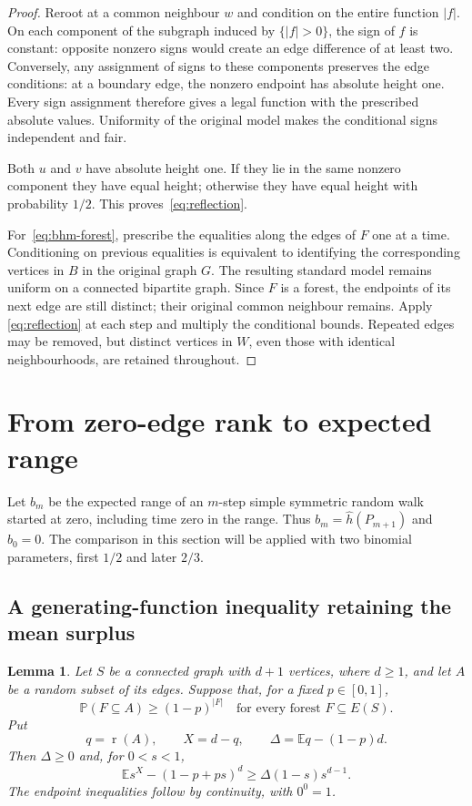\documentclass[11pt,reqno]{amsart}
\newtheorem{lemma}[theorem]{Lemma}
\theoremstyle{remark}
\numberwithin{equation}{section}
\newcommand{\E}{\mathbb E}
\newcommand{\PP}{\mathbb P}
\DeclareMathOperator{\rk}{r}
\begin{document}
\begin{proof}
Reroot at a common neighbour $w$ and condition on the entire function
$|f|$. On each component of the subgraph induced by $\{|f|>0\}$, the
sign of $f$ is constant: opposite nonzero signs would create an edge
difference of at least two. Conversely, any assignment of signs to
these components preserves the edge conditions: at a boundary edge,
the nonzero endpoint has absolute height one. Every sign assignment
therefore gives a legal function with the prescribed absolute values.
Uniformity of the original model makes the conditional signs
independent and fair.

Both $u$ and $v$ have absolute height one. If they lie in the same nonzero
component they have equal height; otherwise they have equal height with
probability $1/2$. This proves~\eqref{eq:reflection}.

For~\eqref{eq:bhm-forest}, prescribe the equalities along the edges of
$F$ one at a time. Conditioning on previous equalities is equivalent to
identifying the corresponding vertices in $B$ in the original graph $G$.
The resulting standard model remains uniform on a connected bipartite
graph. Since $F$ is a forest, the endpoints of its next edge are still
distinct; their original common neighbour remains. Apply
\eqref{eq:reflection} at each step and multiply the conditional bounds.
Repeated edges may be removed, but distinct vertices in $W$, even those
with identical neighbourhoods, are retained throughout.
\end{proof}

\section{From zero-edge rank to expected range}\label{sec:comparison}

Let $b_m$ be the expected range of an $m$-step simple symmetric random walk
started at zero, including time zero in the range. Thus
$b_m=\widehat h(P_{m+1})$ and $b_0=0$. The comparison in this section
will be applied with two binomial parameters, first $1/2$ and later $2/3$.

\subsection{A generating-function inequality retaining the mean surplus}

\begin{lemma}\label{lem:pgf}
Let $S$ be a connected graph with $d+1$ vertices, where $d\ge1$, and
let $A$ be a random subset of its edges. Suppose that, for a fixed
$p\in[0,1]$,
\begin{equation}\label{eq:forest-assumption}
 \PP(F\subseteq A)\ge(1-p)^{|F|}
 \quad\text{for every forest }F\subseteq E(S).
\end{equation}
Put
\[
 q=\rk(A),\qquad X=d-q,\qquad
 \Delta=\E q-(1-p)d.
\]
Then $\Delta\ge0$ and, for $0<s<1$,
\begin{equation}\label{eq:pgf}
 \E s^X-(1-p+ps)^d\ge\Delta(1-s)s^{d-1}.
\end{equation}
The endpoint inequalities follow by continuity, with $0^0=1$.
\end{lemma}
\end{document}
